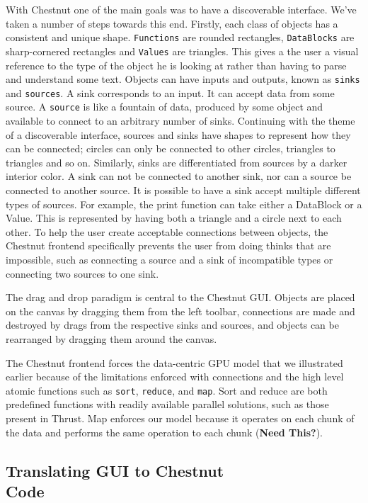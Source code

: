 \documentclass[twocolumn]{article}
\renewcommand{\|}{\origbar} %
\newcommand{\code}[1]{\texttt{#1}}
\begin{document}
With Chestnut one of the main goals was to have a discoverable interface. We've taken a number of steps towards this end. Firstly, each class of objects has a consistent and unique shape. \code{Functions} are rounded rectangles, \code{DataBlocks} are sharp-cornered rectangles and \code{Values} are triangles. This gives a the user a visual reference to the type of the object he is looking at rather than having to parse and understand some text. Objects can have inputs and outputs, known as \code{sinks} and \code{sources}. A sink corresponds to an input. It can accept data from some source. A \code{source} is like a fountain of data, produced by some object and available to connect to an arbitrary number of sinks. Continuing with the theme of a discoverable interface, sources and sinks have shapes to represent how they can be connected; circles can only be connected to other circles, triangles to triangles and so on. Similarly, sinks are differentiated from sources by a darker interior color. A sink can not be connected to another sink, nor can a source be connected to another source. It is possible to have a sink accept multiple different types of sources. For example, the print function can take either a DataBlock or a Value. This is represented by having both a triangle and a circle next to each other. To help the user create acceptable connections between objects, the Chestnut frontend specifically prevents the user from doing thinks that are impossible, such as connecting a source and a sink of incompatible types or connecting two sources to one sink.

The drag and drop paradigm is central to the Chestnut GUI. Objects are placed on the canvas by dragging them from the left toolbar, connections are made and destroyed by drags from the respective sinks and sources, and objects can be rearranged by dragging them around the canvas. 

The Chestnut frontend forces the data-centric GPU model that we illustrated earlier because of the limitations enforced with connections and the high level atomic functions such as \code{sort}, \code{reduce}, and \code{map}. Sort and reduce are both predefined functions with readily available parallel solutions, such as those present in Thrust. Map enforces our model because it operates on each chunk of the data and performs the same operation to each chunk ({\bf Need This?}).

\if@twocolumn
\subsection{Translating GUI to Chestnut \\ Code}
\else
\end{document}
